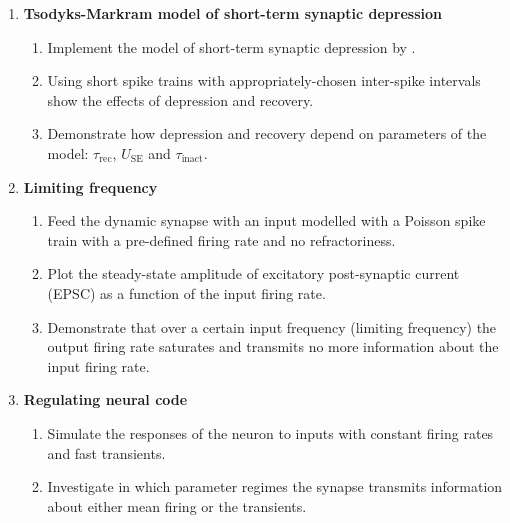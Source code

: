 \documentclass[12pt]{article}
\begin{document}
\begin{enumerate}
    \item \textbf{Tsodyks-Markram model of short-term synaptic
        depression}        

        \begin{enumerate}
            \item Implement the model of short-term synaptic
                depression by \citet{Tsodyks97}.
            \item Using short spike trains with appropriately-chosen inter-spike
                intervals show the effects of depression and recovery.
            \item Demonstrate how depression and recovery depend on
                parameters of the model: $\tau_{\mathrm{rec}}$,
                $U_{\mathrm{SE}}$ and $\tau_{\mathrm{inact}}$.
        \end{enumerate}

    \item \textbf{Limiting frequency}

        \begin{enumerate}
            \item Feed the dynamic synapse with an input modelled with
                a Poisson spike train with a pre-defined firing rate
                and no refractoriness.
            \item Plot the steady-state amplitude of excitatory post-synaptic
                current  (EPSC) as a function of the input firing
                rate.
            \item Demonstrate that over a certain input frequency
                (limiting frequency) the output firing rate saturates
                and transmits no more information about the input firing
                rate.
        \end{enumerate}

    \item \textbf{Regulating neural code}

        \begin{enumerate}
            \item Simulate the responses of the neuron to inputs with
            constant firing rates and fast transients.
        \item Investigate in which parameter regimes the synapse
            transmits information about either mean firing or  the
            transients.
        \end{enumerate}


\end{enumerate}
\end{document}

